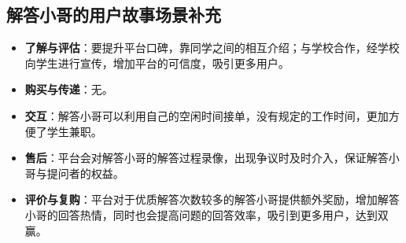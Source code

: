 \documentclass[a4paper]{ctexart}
\begin{document}
\subsection{解答小哥的用户故事场景补充}
\begin{itemize}
  \item \textbf{了解与评估}：要提升平台口碑，靠同学之间的相互介绍；与学校合作，经学校向学生进行宣传，增加平台的可信度，吸引更多用户。
  \item \textbf{购买与传递}：无。
  \item \textbf{交互}：解答小哥可以利用自己的空闲时间接单，没有规定的工作时间，更加方便了学生兼职。
  \item \textbf{售后}：平台会对解答小哥的解答过程录像，出现争议时及时介入，保证解答小哥与提问者的权益。
  \item \textbf{评价与复购}：平台对于优质解答次数较多的解答小哥提供额外奖励，增加解答小哥的回答热情，同时也会提高问题的回答效率，吸引到更多用户，达到双赢。
\end{itemize}
\end{document}
